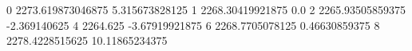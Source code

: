 0 2273.619873046875 5.315673828125
1 2268.30419921875 0.0
2 2265.93505859375 -2.369140625
4 2264.625 -3.67919921875
6 2268.7705078125 0.46630859375
8 2278.4228515625 10.11865234375
